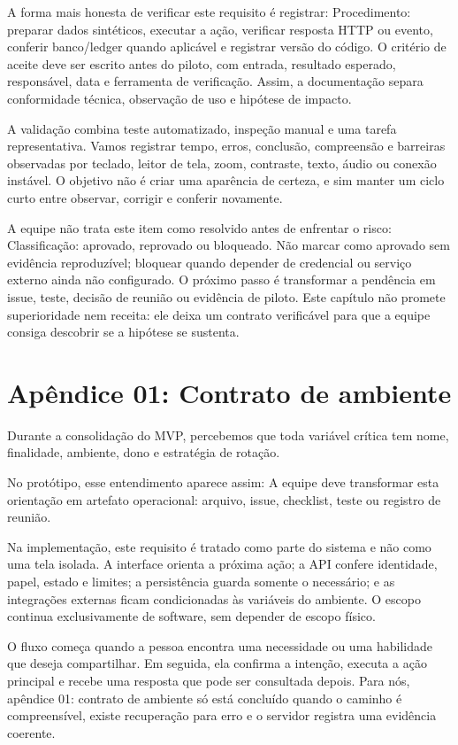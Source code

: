 \documentclass[12pt,oneside,a4paper,article]{abntex2}
\begin{document}
A forma mais honesta de verificar este requisito é registrar: Procedimento: preparar dados sintéticos, executar a ação, verificar resposta HTTP ou evento, conferir banco/ledger quando aplicável e registrar versão do código. O critério de aceite deve ser escrito antes do piloto, com entrada, resultado esperado, responsável, data e ferramenta de verificação. Assim, a documentação separa conformidade técnica, observação de uso e hipótese de impacto.

A validação combina teste automatizado, inspeção manual e uma tarefa representativa. Vamos registrar tempo, erros, conclusão, compreensão e barreiras observadas por teclado, leitor de tela, zoom, contraste, texto, áudio ou conexão instável. O objetivo não é criar uma aparência de certeza, e sim manter um ciclo curto entre observar, corrigir e conferir novamente.

A equipe não trata este item como resolvido antes de enfrentar o risco: Classificação: aprovado, reprovado ou bloqueado. Não marcar como aprovado sem evidência reproduzível; bloquear quando depender de credencial ou serviço externo ainda não configurado. O próximo passo é transformar a pendência em issue, teste, decisão de reunião ou evidência de piloto. Este capítulo não promete superioridade nem receita: ele deixa um contrato verificável para que a equipe consiga descobrir se a hipótese se sustenta.

\section{Apêndice 01: Contrato de ambiente}
Durante a consolidação do MVP, percebemos que toda variável crítica tem nome, finalidade, ambiente, dono e estratégia de rotação.

No protótipo, esse entendimento aparece assim: A equipe deve transformar esta orientação em artefato operacional: arquivo, issue, checklist, teste ou registro de reunião.

Na implementação, este requisito é tratado como parte do sistema e não como uma tela isolada. A interface orienta a próxima ação; a API confere identidade, papel, estado e limites; a persistência guarda somente o necessário; e as integrações externas ficam condicionadas às variáveis do ambiente. O escopo continua exclusivamente de software, sem depender de escopo físico.

O fluxo começa quando a pessoa encontra uma necessidade ou uma habilidade que deseja compartilhar. Em seguida, ela confirma a intenção, executa a ação principal e recebe uma resposta que pode ser consultada depois. Para nós, apêndice 01: contrato de ambiente só está concluído quando o caminho é compreensível, existe recuperação para erro e o servidor registra uma evidência coerente.
\end{document}
